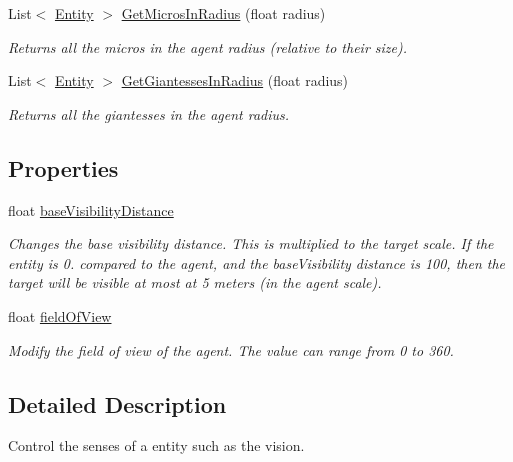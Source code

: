 \begin{DoxyCompactItemize}
List$<$ \mbox{\hyperlink{class_lua_1_1_entity}{Entity}} $>$ \mbox{\hyperlink{class_lua_1_1_senses_adc485743dc4551711e19323a0e93c4a5}{Get\+Micros\+In\+Radius}} (float radius)
\begin{DoxyCompactList}\small\item\em Returns all the micros in the agent radius (relative to their size). \end{DoxyCompactList}\item 
List$<$ \mbox{\hyperlink{class_lua_1_1_entity}{Entity}} $>$ \mbox{\hyperlink{class_lua_1_1_senses_a6f073fd811e4bb71908705e8ae868601}{Get\+Giantesses\+In\+Radius}} (float radius)
\begin{DoxyCompactList}\small\item\em Returns all the giantesses in the agent radius. \end{DoxyCompactList}\end{DoxyCompactItemize}
\subsection*{Properties}
\begin{DoxyCompactItemize}
\item 
float \mbox{\hyperlink{class_lua_1_1_senses_aed3385cd359ba4734ac8c114b524a1b2}{base\+Visibility\+Distance}}
\begin{DoxyCompactList}\small\item\em Changes the base visibility distance. This is multiplied to the target scale. If the entity is 0. compared to the agent, and the base\+Visibility distance is 100, then the target will be visible at most at 5 meters (in the agent scale). \end{DoxyCompactList}\item 
float \mbox{\hyperlink{class_lua_1_1_senses_ac4a708caaa7a7381870d4f21d619c2e9}{field\+Of\+View}}
\begin{DoxyCompactList}\small\item\em Modify the field of view of the agent. The value can range from 0 to 360. \end{DoxyCompactList}\end{DoxyCompactItemize}


\subsection{Detailed Description}
Control the senses of a entity such as the vision. 



